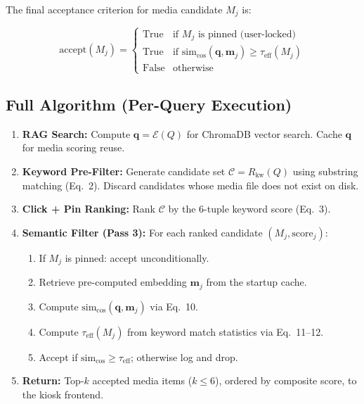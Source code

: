 \documentclass{article}
\begin{document}
The final acceptance criterion for media candidate $M_j$ is:

\begin{equation}
\text{accept}(M_j) = \begin{cases}
\text{True} & \text{if } M_j \text{ is pinned (user-locked)} \\
\text{True} & \text{if } \text{sim}_{\text{cos}}(\mathbf{q}, \mathbf{m}_j) \geq \tau_{\text{eff}}(M_j) \\
\text{False} & \text{otherwise}
\end{cases}
\end{equation}

\subsection{Full Algorithm (Per-Query Execution)}

\begin{enumerate}
  \item \textbf{RAG Search:} Compute $\mathbf{q} = \mathcal{E}(Q)$ for ChromaDB vector search. Cache $\mathbf{q}$ for media scoring reuse.
  \item \textbf{Keyword Pre-Filter:} Generate candidate set $\mathcal{C} = R_{\text{kw}}(Q)$ using substring matching (Eq.~2). Discard candidates whose media file does not exist on disk.
  \item \textbf{Click + Pin Ranking:} Rank $\mathcal{C}$ by the 6-tuple keyword score (Eq.~3).
  \item \textbf{Semantic Filter (Pass 3):} For each ranked candidate $(M_j, \text{score}_j)$:
    \begin{enumerate}
      \item If $M_j$ is pinned: accept unconditionally.
      \item Retrieve pre-computed embedding $\mathbf{m}_j$ from the startup cache.
      \item Compute $\text{sim}_{\text{cos}}(\mathbf{q}, \mathbf{m}_j)$ via Eq.~10.
      \item Compute $\tau_{\text{eff}}(M_j)$ from keyword match statistics via Eq.~11--12.
      \item Accept if $\text{sim}_{\text{cos}} \geq \tau_{\text{eff}}$; otherwise log and drop.
    \end{enumerate}
  \item \textbf{Return:} Top-$k$ accepted media items ($k \leq 6$), ordered by composite score, to the kiosk frontend.
\end{enumerate}
\end{document}

